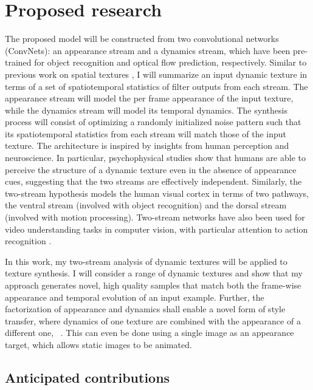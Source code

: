 \section{Proposed research}

The proposed model will be constructed from two convolutional networks
(ConvNets): an appearance stream and a dynamics stream,
which have been pre-trained for object recognition
and optical flow prediction, respectively.
Similar to previous work on spatial textures
\cite{gatys2015,heeger1995pyramid,portilla2000parametric}, I will
summarize an input dynamic texture in terms of a set of
spatiotemporal statistics of filter outputs from each stream.
The appearance stream will model the per frame appearance of
the input texture, while the dynamics stream will model its
temporal dynamics.
The synthesis process will consist of optimizing a randomly initialized noise pattern such that its spatiotemporal statistics from
each stream will match those of the input texture.
The architecture is inspired by insights from human perception and 
neuroscience.
In particular, psychophysical studies \cite{cutting1982} show that
humans are able to perceive the structure of a dynamic texture even
in the absence of appearance cues, suggesting that the two streams
are effectively independent.
Similarly, the two-stream hypothesis \cite{goodale1992} models the 
human visual cortex in terms of two pathways, the ventral stream
(involved with object recognition) and the
dorsal stream (involved with motion processing). Two-stream networks have also been used for video understanding tasks in computer vision, with particular attention to action recognition \cite{simonyan2014,feichtenhofer2016two}.

In this work, my two-stream analysis of
dynamic textures will be applied to texture synthesis.
I will consider a range of dynamic textures and show that 
my approach generates novel, high quality samples that match
both the frame-wise appearance and temporal evolution of an input
example.
Further, the factorization of appearance and dynamics shall enable a 
novel form of style transfer, where dynamics of one texture are 
combined with the appearance of a different one,
\cf\ \cite{gatys2016image}.
This can even be done using a single image as an appearance
target, which allows static images to be animated.

\subsection{Anticipated contributions}

